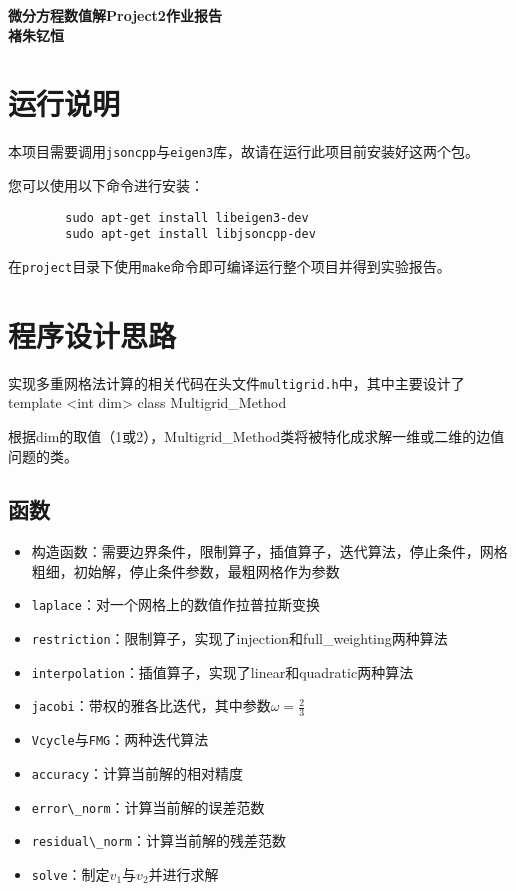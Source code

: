 \documentclass[12]{article}%
\begin{document}
\begin{center}
    \LARGE\songti\textbf{微分方程数值解Project2作业报告} \\%
    \large\kaishu\textbf{褚朱钇恒}%
\end{center}
\section{运行说明}
    本项目需要调用\verb|jsoncpp|与\verb|eigen3|库，故请在运行此项目前安装好这两个包。
    
    您可以使用以下命令进行安装：

    \begin{lstlisting}
        sudo apt-get install libeigen3-dev
        sudo apt-get install libjsoncpp-dev
    \end{lstlisting}

    在\verb|project|目录下使用\verb|make|命令即可编译运行整个项目并得到实验报告。

\section{程序设计思路}
实现多重网格法计算的相关代码在头文件\verb|multigrid.h|中，其中主要设计了template <int dim> class Multigrid\_Method

根据dim的取值（1或2），Multigrid\_Method类将被特化成求解一维或二维的边值问题的类。

\subsection{函数}
\begin{itemize}
    \item 构造函数：需要边界条件，限制算子，插值算子，迭代算法，停止条件，网格粗细，初始解，停止条件参数，最粗网格作为参数
    \item \verb|laplace|：对一个网格上的数值作拉普拉斯变换
    \item \verb|restriction|：限制算子，实现了injection和full\_weighting两种算法
    \item \verb|interpolation|：插值算子，实现了linear和quadratic两种算法
    \item \verb|jacobi|：带权的雅各比迭代，其中参数$\omega=\frac{2}{3}$
    \item \verb|Vcycle|与\verb|FMG|：两种迭代算法
    \item \verb|accuracy|：计算当前解的相对精度
    \item \verb|error\_norm|：计算当前解的误差范数
    \item \verb|residual\_norm|：计算当前解的残差范数
    \item \verb|solve|：制定$v_1$与$v_2$并进行求解
\end{itemize}
\end{document}
